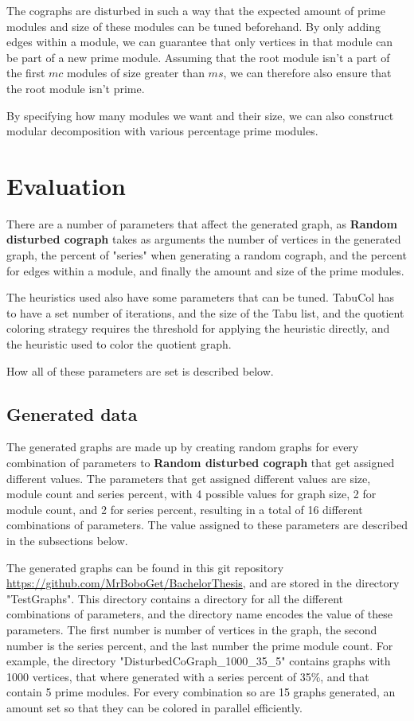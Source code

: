 \documentclass[a4paper]{article}
\begin{document}
The cographs are disturbed in such a way that the expected amount of prime
modules and size of these modules can be tuned beforehand. By only adding edges
within a module, we can guarantee that only vertices in that module can be part
of a new prime module.  Assuming that the root module isn't a part of the first
$mc$ modules of size greater than $ms$, we can therefore also ensure that the
root module isn't prime.

By specifying how many modules we want and their size, we
can also construct modular decomposition with various percentage prime modules.

\section{Evaluation} 
\label{sec:Evaluation} 

There are a number of parameters that affect the generated graph, as
\textbf{Random disturbed cograph} takes as arguments the number of vertices in
the generated graph, the percent of "series" when generating a random cograph,
and the percent for edges within a module, and finally the amount and size of
the prime modules. 

The heuristics used also have some parameters that can be tuned. TabuCol has to
have a set number of iterations, and the size of the Tabu list, and the quotient
coloring strategy requires the threshold for applying the heuristic directly,
and the heuristic used to color the quotient graph.


How all of these parameters are set is described below.

\subsection{Generated data}

The generated graphs are made up by creating random graphs for every
combination of parameters to \textbf{Random disturbed cograph} that get assigned
different values. The parameters that get assigned different values are size,
module count and series percent, with 4 possible values for graph size, 2 for
module count, and 2 for series percent, resulting in a total of 16 different
combinations of parameters. The value assigned to these parameters are described
in the subsections below.

The generated graphs can be found in this git repository
\url{https://github.com/MrBoboGet/BachelorThesis}, and are stored in the
directory "TestGraphs". This directory contains a directory for all the different
combinations of parameters, and the directory name encodes the value of these
parameters. The first number is number of vertices in the graph, the second
number is the series percent, and the last number the prime module count.
For example, the directory "DisturbedCoGraph\_1000\_35\_5" contains graphs with 
1000 vertices, that where generated with a series percent of 35\%, and that
contain 5 prime modules. For every combination so are 15 graphs generated, 
an amount set so that they can be colored in parallel efficiently.
\end{document}
